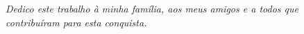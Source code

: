 \begin{dedicatoria}
  \vspace*{\fill}
  \begin{flushright}
    \textit{Dedico este trabalho à minha família, aos meus amigos e a todos que contribuíram para esta conquista.}
  \end{flushright}
\end{dedicatoria}

